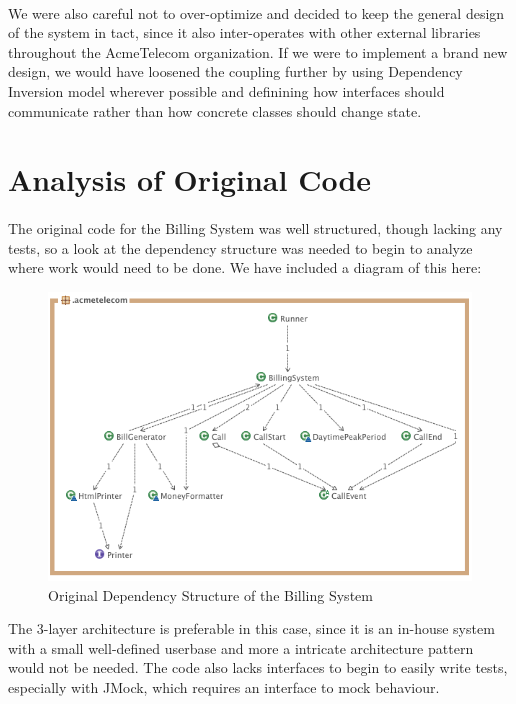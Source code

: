 \documentclass[a4paper,12pt,oneside,final]{article}
\newenvironment{changemargin}[2]{\begin{list}{}{%
\setlength{\topsep}{0pt}%
\setlength{\leftmargin}{0pt}%
\setlength{\rightmargin}{0pt}%
\setlength{\listparindent}{\parindent}%
\setlength{\itemindent}{\parindent}%
\setlength{\parsep}{0pt plus 1pt}%
\addtolength{\leftmargin}{#1}%
\addtolength{\rightmargin}{#2}%
}\item }{\end{list}}
\begin{document}
\paragraph{}
We were also careful not to over-optimize and decided to keep the general design of the system in tact, since it also inter-operates with other external libraries throughout the AcmeTelecom organization.  If we were to implement a brand new design, we would have loosened the coupling further by using Dependency Inversion model wherever possible and definining how interfaces should communicate rather than how concrete classes should change state.
	

\section{Analysis of Original Code} %
\paragraph{}
The original code for the Billing System was well structured, though lacking any tests, so a look at the dependency structure was needed to begin to analyze where work would need to be done.  We have included a diagram of this here:
\begin{figure}[!h]
\begin{changemargin}{-20mm}{-20mm}
\center
\includegraphics[scale=0.55]{Original_Structure.png}
\caption{Original Dependency Structure of the Billing System}
\end{changemargin}
\end{figure}
The 3-layer architecture is preferable in this case, since it is an in-house system with a small well-defined userbase and more a intricate architecture pattern would not be needed. The code also lacks interfaces to begin to easily write tests, especially with JMock, which requires an interface to mock behaviour.  
\end{document}
